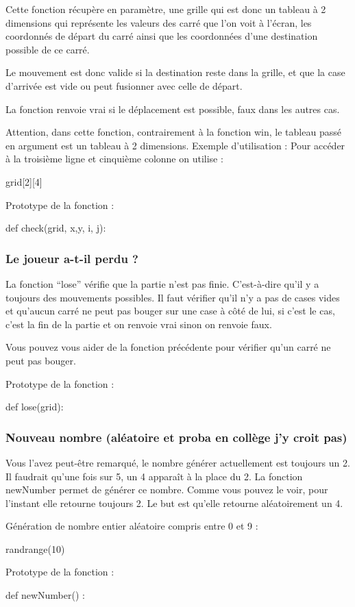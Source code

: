 Cette fonction récupère en paramètre, une grille qui est donc un tableau à 2 dimensions qui représente les valeurs des carré que l'on voit à l'écran, les coordonnés de départ du  carré ainsi que les coordonnées d'une destination possible de ce carré.


Le mouvement est donc valide si la destination reste dans la grille, et que la case d'arrivée est vide ou peut fusionner avec celle de départ.




La fonction renvoie vrai si le déplacement est possible, faux dans les autres cas. 






Attention, dans cette fonction, contrairement à la fonction win, le tableau passé en argument est un tableau à 2 dimensions.
Exemple d'utilisation :
Pour accéder à la troisième ligne et cinquième colonne on utilise : 
\begin{pythonCode}
 grid[2][4] 
\end{pythonCode}


Prototype de la fonction :
\begin{pythonCode}
def check(grid, x,y, i, j):
\end{pythonCode}








\subsubsection{Le joueur a-t-il perdu ?}
La fonction “lose” vérifie que la partie n’est pas finie. C’est-à-dire qu’il y a toujours des mouvements possibles.
Il faut vérifier qu’il n’y a pas de cases vides et qu'aucun carré ne peut pas bouger sur une case à côté de lui, si c’est le cas, c'est la fin de la partie et on renvoie vrai sinon on renvoie faux.


Vous pouvez vous aider de la fonction précédente pour vérifier qu'un carré ne peut pas bouger.


Prototype de la fonction :
\begin{pythonCode}
def lose(grid):
\end{pythonCode}












\subsubsection{Nouveau nombre (aléatoire et proba en collège j'y croit pas)} 
Vous l'avez peut-être remarqué, le nombre générer actuellement est toujours un 2. Il faudrait qu'une fois sur 5, un 4 apparaît à la place du 2. 
La fonction newNumber permet de générer ce nombre. Comme vous pouvez le voir, pour l'instant elle retourne toujours 2.
Le but est qu'elle retourne aléatoirement un 4.  


Génération de nombre entier aléatoire compris entre 0 et 9 :
\begin{pythonCode}
randrange(10)
\end{pythonCode}




Prototype de la fonction :
\begin{pythonCode}
def newNumber() :
\end{pythonCode}




